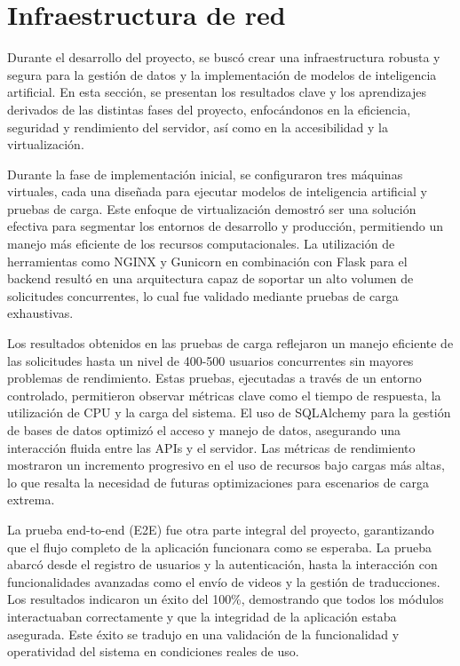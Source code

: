 \section{Infraestructura de red} 

Durante el desarrollo del proyecto, se buscó crear una infraestructura robusta y segura para la gestión de datos y la implementación de modelos de inteligencia artificial. En esta sección, se presentan los resultados clave y los aprendizajes derivados de las distintas fases del proyecto, enfocándonos en la eficiencia, seguridad y rendimiento del servidor, así como en la accesibilidad y la virtualización.

Durante la fase de implementación inicial, se configuraron tres máquinas virtuales, cada una diseñada para ejecutar modelos de inteligencia artificial y pruebas de carga. Este enfoque de virtualización demostró ser una solución efectiva para segmentar los entornos de desarrollo y producción, permitiendo un manejo más eficiente de los recursos computacionales. La utilización de herramientas como NGINX y Gunicorn en combinación con Flask para el backend resultó en una arquitectura capaz de soportar un alto volumen de solicitudes concurrentes, lo cual fue validado mediante pruebas de carga exhaustivas.

Los resultados obtenidos en las pruebas de carga reflejaron un manejo eficiente de las solicitudes hasta un nivel de 400-500 usuarios concurrentes sin mayores problemas de rendimiento. Estas pruebas, ejecutadas a través de un entorno controlado, permitieron observar métricas clave como el tiempo de respuesta, la utilización de CPU y la carga del sistema. El uso de SQLAlchemy para la gestión de bases de datos optimizó el acceso y manejo de datos, asegurando una interacción fluida entre las APIs y el servidor. Las métricas de rendimiento mostraron un incremento progresivo en el uso de recursos bajo cargas más altas, lo que resalta la necesidad de futuras optimizaciones para escenarios de carga extrema.

La prueba end-to-end (E2E) fue otra parte integral del proyecto, garantizando que el flujo completo de la aplicación funcionara como se esperaba. La prueba abarcó desde el registro de usuarios y la autenticación, hasta la interacción con funcionalidades avanzadas como el envío de videos y la gestión de traducciones. Los resultados indicaron un éxito del 100\%, demostrando que todos los módulos interactuaban correctamente y que la integridad de la aplicación estaba asegurada. Este éxito se tradujo en una validación de la funcionalidad y operatividad del sistema en condiciones reales de uso.

